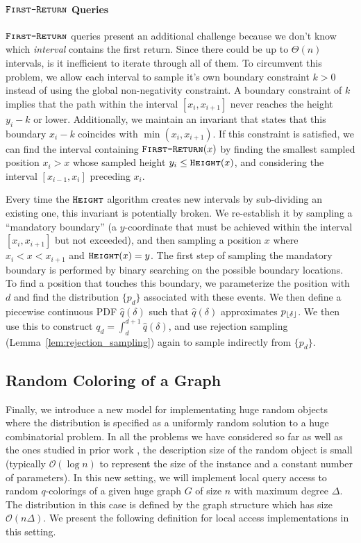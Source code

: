 \paragraph*{$\texttt{\textsc{First-Return}}$ Queries}
\label{par:_first-return_queries}
$\texttt{\textsc{First-Return}}$ queries present an additional challenge because we don't know which \emph{interval} contains the first return.
Since there could be up to $\Theta(n)$ intervals, is it inefficient to iterate through all of them.
To circumvent this problem, we allow each interval to sample it's own boundary constraint $k>0$ instead of using the global non-negativity constraint.
A boundary constraint of $k$ implies that the path within the interval $[x_i,x_{i+1}]$ never reaches the height $y_i-k$ or lower.
Additionally, we maintain an invariant that states that this boundary $x_i-k$ coincides with $\min(x_i,x_{i+1})$.
If this constraint is satisfied, we can find the interval containing $\texttt{\textsc{First-Return}}(x)$ by finding the smallest sampled position $x_i>x$
whose sampled height $y_i \le \texttt{\textsc{Height}}(x)$, and considering the interval $[x_{i-1},x_i]$ preceding $x_i$.

Every time the $\texttt{\textsc{Height}}$ algorithm creates new intervals by sub-dividing an existing one, this invariant is potentially broken.
We re-establish it by sampling a ``mandatory boundary'' (a $y$-coordinate that must be achieved within the interval $[x_i,x_{i+1}]$ but not exceeded),
and then sampling a position $x$ where $x_i < x < x_{i+1}$ and $\texttt{\textsc{Height}}(x) = y$.
The first step of sampling the mandatory boundary is performed by binary searching on the possible boundary locations.
To find a position that touches this boundary, we parameterize the position with $d$ and find the distribution $\{p_d\}$ associated with these events.
We then define a piecewise continuous PDF $\hat q(\delta)$ such that $\hat q(\delta)$ approximates $p_{\lfloor\delta\rfloor}$.
We then use this to construct $q_d = \int_d^{d+1}\hat q(\delta)$,
and use rejection sampling (Lemma~\ref{lem:rejection_sampling}) again to sample indirectly from $\{p_d\}$.




\subsection{Random Coloring of a Graph}
\label{sec:overview_random_coloring_of_a_graph}
Finally, we introduce a new model for implementating huge random objects
where the distribution is specified as a uniformly random solution to a huge combinatorial problem.
In all the problems we have considered so far as well as the ones studied in prior work \cite{huge,sparse,reut}, the description size
of the random object is small (typically $\mathcal O(\log n)$ to represent the size of the instance and a constant number of parameters).
In this new setting, we will implement local query access to random $q$-colorings of a given huge graph $G$ of size $n$ with maximum degree $\Delta$.
The distribution in this case is defined by the graph structure which has size $\mathcal O(n\Delta)$.
We present the following definition for local access implementations in this setting.

